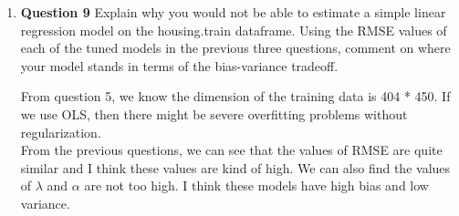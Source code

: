 \documentclass[11pt,a4paper]{article}
\begin{document}
\begin{enumerate}
    \item \textbf{Question 9} Explain why you would not be able to            estimate a simple linear regression model on the
           housing.train dataframe. Using the RMSE values of each of the tuned models in the previous three questions, comment on where your model stands in terms of the
           bias-variance tradeoff.

		  \begin{description}
	             From question 5, we know the dimension of the training data is 404 * 450. If we use OLS, then there might be severe overfitting problems without regularization.\\
	             From the previous questions, we can see that the values of RMSE are quite similar and I think these values are kind of high. We can also find the values of $\lambda$ and $\alpha$ are not too high. I think these models have high bias and low variance.
	             \end{description}
          
\end{enumerate}
\end{document}

